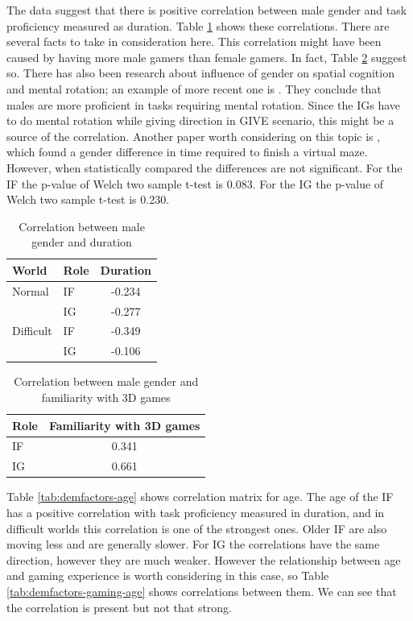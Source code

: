 The data suggest that there is positive correlation between male gender and task proficiency measured as duration. Table \ref{tab:demfactors-gender} shows these correlations. There are several facts to take in consideration here. This correlation might have been caused by having more male gamers than female gamers. In fact, Table \ref{tab:demfactors-gender-fam} suggest so. There has also been research about influence of gender on spatial cognition and mental rotation; an example of more recent one is \citep{geary2000sex}. They conclude that males are more proficient in tasks requiring mental rotation. Since the IGs have to do mental rotation while giving direction in GIVE scenario, this might be a source of the correlation. Another paper worth considering on this topic is \citep{moffat1998navigation}, which found a gender difference in time required to finish a virtual maze. However, when statistically compared the differences are not significant. For the IF the p-value of Welch two sample t-test is 0.083. For the IG the p-value of Welch two sample t-test is 0.230.

\begin{table}[!htbp]
 \centering
\begin{tabular}{llc}
\toprule
 World & Role   & Duration \\
\midrule
Normal & IF &	-0.234\\
 & IG &	-0.277\\
\midrule
Difficult & IF & -0.349\\
 & IG &	-0.106\\
\bottomrule
\end{tabular}
\caption{Correlation between male gender and duration}
\label{tab:demfactors-gender}
\end{table}

\begin{table}[!htbp]
 \centering
\begin{tabular}{lc}
\toprule
Role    & Familiarity with 3D games \\
\midrule
 IF &	 0.341\\
 IG &	0.661\\
\bottomrule
\end{tabular}
\caption{Correlation between male gender and familiarity with 3D games}
\label{tab:demfactors-gender-fam}
\end{table}

Table \ref{tab:demfactors-age} shows correlation matrix for age. The age of the IF has a positive correlation with task proficiency measured in duration, and in difficult worlds this correlation is one of the strongest ones. Older IF are also moving less and are generally slower. For IG the correlations have the same direction, however they are much weaker. However the relationship between age and gaming experience is worth considering in this case, so Table \ref{tab:demfactors-gaming-age} shows correlations between them. We can see that the correlation is present but not that strong.

